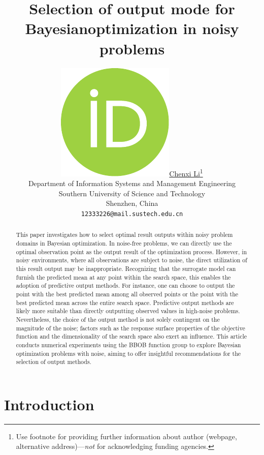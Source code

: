 \documentclass{article}
\title{Selection of output mode for Bayesianoptimization in noisy problems}
\author{ \href{https://orcid.org/0000-0000-0000-0000}{\includegraphics[scale=0.06]{orcid.pdf}\hspace{1mm}Chenxi Li}\thanks{Use footnote for providing further
		information about author (webpage, alternative
		address)---\emph{not} for acknowledging funding agencies.} \\
	Department of Information Systems and Management Engineering\\
	Southern University of Science and Technology\\
	Shenzhen, China\\
	\texttt{12333226@mail.sustech.edu.cn} \\
}
\begin{document}
\maketitle

\begin{abstract}
	\hspace{2em}This paper investigates how to select optimal result outputs within noisy problem domains in Bayesian optimization. In noise-free problems, we can directly use the optimal observation point as the output result of the optimization process. However, in noisy environments, where all observations are subject to noise, the direct utilization of this result output may be inappropriate. Recognizing that the surrogate model can furnish the predicted mean at any point within the search space, this 
	enables the adoption of predictive output methods. For instance, one can choose to output the point with the best predicted mean among all observed points or the point with the best predicted mean across the entire search space. Predictive output methods are likely more suitable than directly outputting observed values in high-noise problems. Nevertheless, the choice of the output method is not solely contingent on the magnitude of the noise; factors such as the response surface properties of the objective function and the dimensionality of the search space also exert an influence. This article conducts numerical experiments using the BBOB function group to explore Bayesian optimization problems with noise, aiming to offer insightful recommendations for the selection of output methods.
\end{abstract}





\section{Introduction}
\end{document}
